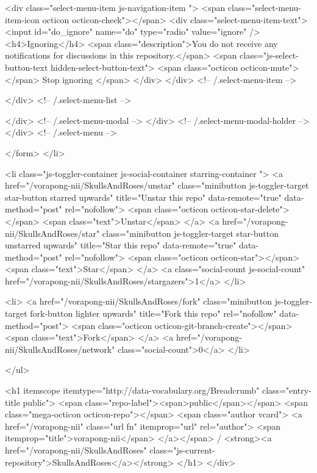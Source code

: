             <div class="select-menu-item js-navigation-item ">
              <span class="select-menu-item-icon octicon octicon-check"></span>
              <div class="select-menu-item-text">
                <input id="do_ignore" name="do" type="radio" value="ignore" />
                <h4>Ignoring</h4>
                <span class="description">You do not receive any notifications for discussions in this repository.</span>
                <span class="js-select-button-text hidden-select-button-text">
                  <span class="octicon octicon-mute"></span>
                  Stop ignoring
                </span>
              </div>
            </div> <!-- /.select-menu-item -->

          </div> <!-- /.select-menu-list -->

        </div> <!-- /.select-menu-modal -->
      </div> <!-- /.select-menu-modal-holder -->
    </div> <!-- /.select-menu -->

</form>
    </li>

    <li class="js-toggler-container js-social-container starring-container ">
      <a href="/vorapong-nii/SkullsAndRoses/unstar" class="minibutton js-toggler-target star-button starred upwards" title="Unstar this repo" data-remote="true" data-method="post" rel="nofollow">
        <span class="octicon octicon-star-delete"></span>
        <span class="text">Unstar</span>
      </a>
      <a href="/vorapong-nii/SkullsAndRoses/star" class="minibutton js-toggler-target star-button unstarred upwards" title="Star this repo" data-remote="true" data-method="post" rel="nofollow">
        <span class="octicon octicon-star"></span>
        <span class="text">Star</span>
      </a>
      <a class="social-count js-social-count" href="/vorapong-nii/SkullsAndRoses/stargazers">1</a>
    </li>

        <li>
          <a href="/vorapong-nii/SkullsAndRoses/fork" class="minibutton js-toggler-target fork-button lighter upwards" title="Fork this repo" rel="nofollow" data-method="post">
            <span class="octicon octicon-git-branch-create"></span>
            <span class="text">Fork</span>
          </a>
          <a href="/vorapong-nii/SkullsAndRoses/network" class="social-count">0</a>
        </li>


</ul>

              <h1 itemscope itemtype="http://data-vocabulary.org/Breadcrumb" class="entry-title public">
                <span class="repo-label"><span>public</span></span>
                <span class="mega-octicon octicon-repo"></span>
                <span class="author vcard">
                  <a href="/vorapong-nii" class="url fn" itemprop="url" rel="author">
                  <span itemprop="title">vorapong-nii</span>
                  </a></span> /
                <strong><a href="/vorapong-nii/SkullsAndRoses" class="js-current-repository">SkullsAndRoses</a></strong>
              </h1>
            </div>

